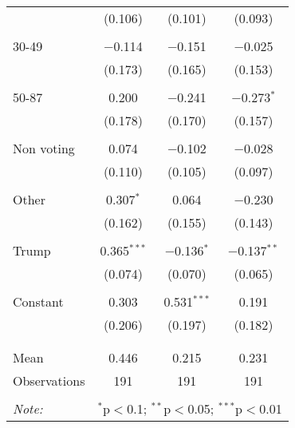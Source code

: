 \begin{tabular}{@{\extracolsep{5pt}}lccc}
  & (0.106) & (0.101) & (0.093) \\ 
  & & & \\ 
 30-49 & $-$0.114 & $-$0.151 & $-$0.025 \\ 
  & (0.173) & (0.165) & (0.153) \\ 
  & & & \\ 
 50-87 & 0.200 & $-$0.241 & $-$0.273$^{*}$ \\ 
  & (0.178) & (0.170) & (0.157) \\ 
  & & & \\ 
 Non voting & 0.074 & $-$0.102 & $-$0.028 \\ 
  & (0.110) & (0.105) & (0.097) \\ 
  & & & \\ 
 Other & 0.307$^{*}$ & 0.064 & $-$0.230 \\ 
  & (0.162) & (0.155) & (0.143) \\ 
  & & & \\ 
 Trump & 0.365$^{***}$ & $-$0.136$^{*}$ & $-$0.137$^{**}$ \\ 
  & (0.074) & (0.070) & (0.065) \\ 
  & & & \\ 
 Constant & 0.303 & 0.531$^{***}$ & 0.191 \\ 
  & (0.206) & (0.197) & (0.182) \\ 
  & & & \\ 
\hline \\[-1.8ex] 
Mean & 0.446 & 0.215 & 0.231 \\ 
Observations & 191 & 191 & 191 \\ 
\hline 
\hline \\[-1.8ex] 
\textit{Note:}  & \multicolumn{3}{r}{$^{*}$p$<$0.1; $^{**}$p$<$0.05; $^{***}$p$<$0.01} \\ 
\end{tabular} 
